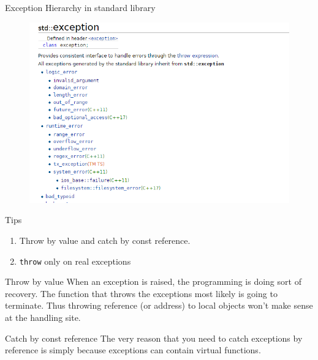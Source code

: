 \begin{frame}{Exception Hierarchy in standard library}
\vspace{-0.2in}
\begin{figure}
	\centering
	\includegraphics[scale=0.55]{fig/rc6stdexp}
\end{figure}
\end{frame}

\begin{frame}{Tips}
\begin{enumerate}
	\item Throw by value and catch by const reference.
	\item \texttt{throw} only on real exceptions
\end{enumerate}
\begin{block}{Throw by value}
	When an exception is raised, the programming is doing sort of recovery. The function that throws the exceptions most likely is going to terminate.
	Thus throwing reference (or address) to local objects won't make sense at the handling site.  
\end{block}
\begin{block}{Catch by const reference}
	The very reason that you need to catch exceptions by reference is simply because exceptions can contain virtual functions.
\end{block}
\end{frame}


